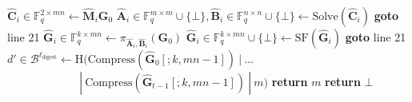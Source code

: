 \begin{algorithm}[H]
\begin{algorithmic}[1]
        \State $\hat{\textbf{C}}_i \in \mathds{F}_q^{2 \times mn} \gets \hat{\textbf{M}}_i \textbf{G}_0$
        \State $\hat{\textbf{A}}_i \in \mathds{F}_q^{m \times m} \cup \{\bot\}, \hat{\textbf{B}}_i \in \mathds{F}_q^{n \times n} \cup \{\bot\} \gets \text{Solve}(\hat{\textbf{C}}_i)$
            \State \textbf{goto} line 21
        \EndIf
        \State $\hat{\textbf{G}}_i \in \mathds{F}_q^{k \times mn} \gets \pi_{\hat{\textbf{A}}_i, \hat{\textbf{B}}_i}(\textbf{G}_0)$
        \State $\hat{\textbf{G}}_i \in \mathds{F}_q^{k \times mn} \cup \{\bot\} \gets \text{SF}(\hat{\textbf{G}}_i)$
            \State \textbf{goto} line 21
        \EndIf
    \EndIf
\EndFor
\State $d' \in \mathcal{B}^{\ell_\text{digest}} \gets \text{H}(\text{Compress}(\hat{\textbf{G}}_0[;k,mn-1])~|~\ldots$\\
$\quad\quad\quad\quad\quad\quad~~|~\text{Compress}(\hat{\textbf{G}}_{t-1}[;k,mn-1])~|~m)$
    \State \textbf{return} $m$
\Else
    \State \textbf{return} $\bot$
\EndIf
\end{algorithmic}
\end{algorithm}